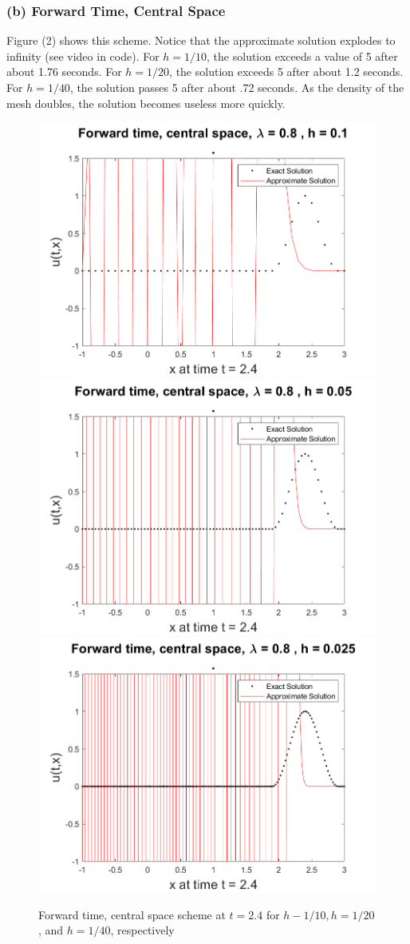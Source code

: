 \documentclass[12pt]{article}
\begin{document}
\subsubsection*{(b) Forward Time, Central Space}

Figure (2) shows this scheme. Notice that the approximate solution explodes to infinity  (see video in code). For $h=1/10$, the solution exceeds a value of 5 after about 1.76 seconds. For $h=1/20$, the solution exceeds 5 after about 1.2 seconds. For $h=1/40$, the solution passes 5 after about .72 seconds. As the density of the mesh doubles, the solution becomes useless more quickly.

\begin{figure}
	\centering
	\includegraphics[width=.6\linewidth]{./code/b_forward_time_central_space_1_10th.png}	\includegraphics[width=.6\linewidth]{./code/b_forward_time_central_space_1_20th.png}
	\includegraphics[width=.6\linewidth]{./code/b_forward_time_central_space_1_40th.png}
	\caption{Forward time, central space scheme at $t=2.4$ for $h-1/10, h=1/20$, and $h=1/40$, respectively}
\end{figure}
\end{document}
